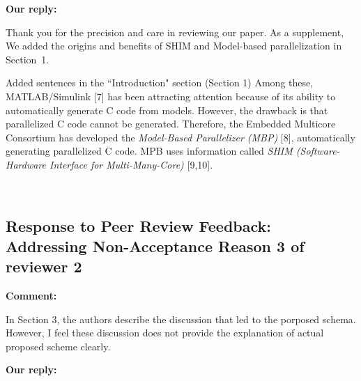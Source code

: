 \documentclass{article}
\begin{document}
\begin{flushleft}
  \textbf{Our reply:}
\end{flushleft}

\begin{adjustwidth}{1cm}{1cm}  %
    Thank you for the precision and care in reviewing our paper. As a supplement, We added the origins and benefits of SHIM and Model-based parallelization in Section~1.
\end{adjustwidth}
\bigskip
\begin{itembox}[|]{Added sentences in the ``Introduction" section (Section 1)}
    Among these, MATLAB/Simulink [7] has been attracting attention because of its ability to automatically generate C code from models. 
    However, the drawback is that parallelized C code cannot be generated.
    Therefore, the Embedded Multicore Consortium has developed the \textit{Model-Based Parallelizer (MBP)} [8], automatically generating parallelized C code. 
    MPB uses information called \textit{SHIM (Software-Hardware Interface for Multi-Many-Core)} [9,10].
\end{itembox}\\

\newpage
\subsection{Response to Peer Review Feedback: Addressing Non-Acceptance Reason 3 of reviewer 2}
\begin{flushleft}
  \textbf{Comment:}

\end{flushleft}
\begin{adjustwidth}{1cm}{1cm}  %
    In Section 3, the authors describe the discussion that led to the porposed schema. 
    However, I feel these discussion does not provide the explanation of actual proposed scheme clearly.  
\end{adjustwidth}
    
\begin{flushleft}
  \textbf{Our reply:}
\end{flushleft}
\end{document}
